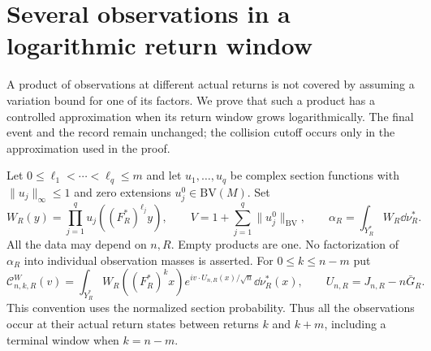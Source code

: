 \section{Several observations in a logarithmic return window}
\label{sec:logarithmic-return-windows}
A product of observations at different actual returns is not covered
by assuming a variation bound for one of its factors. We prove that
such a product has a controlled approximation when its return window
grows logarithmically. The final event and the record remain unchanged;
the collision cutoff occurs only in the approximation used in the proof.

Let $0\le\ell_1<\cdots<\ell_q\le m$ and let $u_1,\ldots,u_q$
be complex section functions with $\|u_j\|_\infty\le1$ and
zero extensions $u_j^0\in\mathrm{BV}(M)$. Set
\begin{equation}\label{eq:window-weight-definition}
 W_R(y)=\prod_{j=1}^{q}u_j((F_R^*)^{\ell_j}y),\qquad
 V=1+\sum_{j=1}^{q}\|u_j^0\|_{\mathrm{BV}},\qquad
 \alpha_R=\int_{Y_R^*}W_R\dd\nu_R^*.
\end{equation}
All the data may depend on $n,R$. Empty products are one. No
factorization of $\alpha_R$ into individual observation masses is
asserted. For $0\le k\le n-m$ put
\begin{equation}\label{eq:window-transform}
 \mathcal C_{n,k,R}^{W}(v)=
 \int_{Y_R^*}W_R((F_R^*)^kx)
 e^{iv\cdot U_{n,R}(x)/\sqrt n}\dd\nu_R^*(x),
 \qquad U_{n,R}=J_{n,R}-n\bar G_R.
\end{equation}
This convention uses the normalized section probability. Thus all the
observations occur at their actual return states between returns $k$
and $k+m$, including a terminal window when $k=n-m$.

